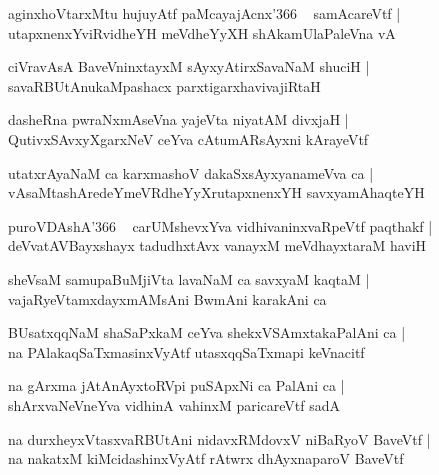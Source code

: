 \documentclass[twoside,12pt,openright]{book}
\newcounter{shloka}[chapter]
\begin{document}
\begin{shloka}
aginxhoVtarxMtu  hujuyAtf paMcayajAcnx\char'366 ~ samAcareVtf |\\
utapxnenxYviRvidheYH meVdheYyXH shAkamUlaPaleVna vA 
\end{shloka}

\begin{shloka}
ciVravAsA BaveVninxtayxM sAyxyAtirxSavaNaM shuciH |\\
savaRBUtAnukaMpashacx parxtigarxhavivajiRtaH
\end{shloka}

\begin{shloka}
dasheRna pwraNxmAseVna yajeVta niyatAM divxjaH |\\
QutivxSAvxyXgarxNeV ceYva cAtumARsAyxni kArayeVtf 
\end{shloka}

\begin{shloka}
utatxrAyaNaM ca karxmashoV dakaSxsAyxyanameVva ca |\\
vAsaMtashAredeYmeVRdheYyXrutapxnenxYH savxyamAhaqteYH 
\end{shloka}

\begin{shloka}
puroVDAshA\char'366 ~ carUMshevxYva vidhivaninxvaRpeVtf paqthakf |\\
deVvatAVBayxshayx tadudhxtAvx vanayxM meVdhayxtaraM haviH 
\end{shloka}

\begin{shloka}
sheVsaM samupaBuMjiVta lavaNaM ca savxyaM kaqtaM |\\
vajaRyeVtamxdayxmAMsAni BwmAni karakAni ca 
\end{shloka}

\begin{shloka}
BUsatxqqNaM shaSaPxkaM ceYva shekxVSAmxtakaPalAni ca |\\
na PAlakaqSaTxmasinxVyAtf utasxqqSaTxmapi keVnacitf
\end{shloka}

\begin{shloka}
na gArxma jAtAnAyxtoRVpi puSApxNi ca PalAni ca |\\
shArxvaNeVneYva vidhinA vahinxM paricareVtf sadA 
\end{shloka}

\begin{shloka}
na durxheyxVtasxvaRBUtAni nidavxRMdovxV niBaRyoV BaveVtf |\\
na nakatxM kiMcidashinxVyAtf rAtwrx dhAyxnaparoV BaveVtf 
\end{shloka}
\end{document}
